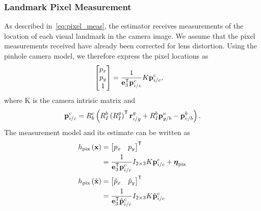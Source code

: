 \subsubsection{Landmark Pixel Measurement}
As described in~\eqref{eq:pixel_meas}, the estimator receives measurements of
the location of each visual landmark in the camera image. We assume that the
pixel measurements received have already been corrected for lens distortion.
Using the pinhole camera model, we therefore express the pixel locations as
\begin{align}
  \begin{bmatrix}
    p_x \\ p_y \\ 1
  \end{bmatrix} &= \frac{1}{\boldsymbol{\mathrm{e}}_3^{\mathsf{T}} \boldsymbol{\mathrm{p}}_{i/c}^c} K
  \boldsymbol{\mathrm{p}}_{i/c}^c,
\end{align}
where K is the camera intrisic matrix and 
\begin{align}
  \vect{p}_{i/c}^c = R_b^c \left( R_I^b \left( R_I^g \right)^\transpose
  \vect{r}_{i/g}^g + R_I^b \vect{p}_{g/b}^v - \vect{p}_{c/b}^b \right).
  \label{eq:p_i_c_c}
\end{align}
The measurement model and its estimate can be written as
\begin{align}
  h_{\text{pix}} \left( \boldsymbol{\mathrm{x}} \right)
  &= \begin{bmatrix} p_x & p_y \end{bmatrix}^{\mathsf{T}} \\
  &= \frac{1}{\boldsymbol{\mathrm{e}}_3^{\mathsf{T}} \boldsymbol{\mathrm{p}}_{i/c}^c} I_{2 \times 3} K
  \boldsymbol{\mathrm{p}}_{i/c}^c + \boldsymbol{\mathrm{\eta}}_{\text{pix}} \\
  h_{\text{pix}} \left( \hat{\boldsymbol{\mathrm{x}}} \right)
  &= \begin{bmatrix} \hat{p}_x & \hat{p}_y \end{bmatrix}^{\mathsf{T}} \\
  &= \frac{1}{\boldsymbol{\mathrm{e}}_3^{\mathsf{T}} \hat{\boldsymbol{\mathrm{p}}}_{i/c}^c} I_{2 \times 3} K
  \hat{\boldsymbol{\mathrm{p}}}_{i/c}^c
\end{align}

